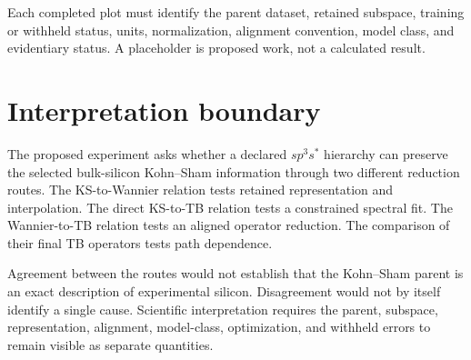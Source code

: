 Each completed plot must identify the parent dataset, retained subspace,
training or withheld status, units, normalization, alignment convention, model
class, and evidentiary status. A placeholder is proposed work, not a calculated
result.

\section{Interpretation boundary}

The proposed experiment asks whether a declared $sp^3s^{\ast}$ hierarchy can
preserve the selected bulk-silicon Kohn--Sham information through two different
reduction routes. The KS-to-Wannier relation tests retained representation and
interpolation. The direct KS-to-TB relation tests a constrained spectral fit.
The Wannier-to-TB relation tests an aligned operator reduction. The comparison
of their final TB operators tests path dependence.

Agreement between the routes would not establish that the Kohn--Sham parent is
an exact description of experimental silicon. Disagreement would not by itself
identify a single cause. Scientific interpretation requires the parent,
subspace, representation, alignment, model-class, optimization, and withheld
errors to remain visible as separate quantities.
